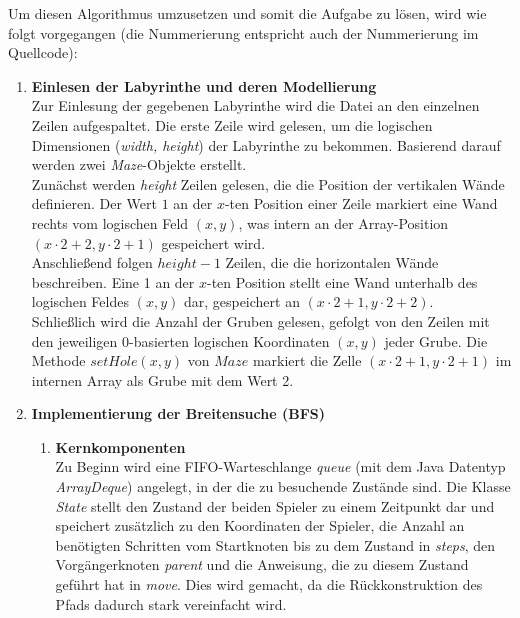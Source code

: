 \documentclass[a4paper,10pt,ngerman]{scrartcl}
\begin{document}
Um diesen Algorithmus umzusetzen und somit die Aufgabe zu lösen, wird wie folgt vorgegangen (die Nummerierung entspricht auch der Nummerierung im Quellcode): 
\begin{enumerate}
  \item \textbf{Einlesen der Labyrinthe und deren Modellierung}\\
  Zur Einlesung der gegebenen Labyrinthe wird die Datei an den einzelnen Zeilen aufgespaltet. Die erste Zeile wird gelesen, um die logischen Dimensionen (\textit{width, height}) der Labyrinthe zu bekommen. Basierend darauf werden zwei \textit{Maze}-Objekte erstellt. 
  \\
  Zunächst werden \textit{height} Zeilen gelesen, die die Position der vertikalen Wände definieren. Der Wert $1$ an der $x$-ten Position einer Zeile markiert eine Wand rechts vom logischen Feld $(x, y)$, was intern an der Array-Position $(x\cdot2+2, y\cdot2+1)$ gespeichert wird.
  \\
  Anschließend folgen $height - 1$ Zeilen, die die horizontalen Wände beschreiben. Eine 1 an der $x$-ten Position stellt eine Wand unterhalb des logischen Feldes $(x, y)$ dar, gespeichert an $(x\cdot2+1, y\cdot2+2)$. 
  \\
  Schließlich wird die Anzahl der Gruben gelesen, gefolgt von den Zeilen mit den jeweiligen 0-basierten logischen Koordinaten $(x, y)$ jeder Grube. Die Methode $setHole(x, y)$ von $Maze$ markiert die Zelle $(x\cdot2+1, y\cdot2+1)$ im internen Array als Grube mit dem Wert 2. 
  \item \textbf{Implementierung der Breitensuche (BFS)}
  \begin{enumerate}
    \item \textbf{Kernkomponenten}\\
    Zu Beginn wird eine FIFO-Warteschlange \textit{queue} (mit dem Java Datentyp \textit{ArrayDeque}) angelegt, in der die zu besuchende Zustände sind. Die Klasse \textit{State} stellt den Zustand der beiden Spieler zu einem Zeitpunkt dar und speichert zusätzlich zu den Koordinaten der Spieler, die Anzahl an benötigten Schritten vom Startknoten bis zu dem Zustand in \textit{steps}, den Vorgängerknoten \textit{parent} und die Anweisung, die zu diesem Zustand geführt hat in \textit{move}. Dies wird gemacht, da die Rückkonstruktion des Pfads dadurch stark vereinfacht wird. 
    \\\newline

\end{enumerate}
\end{enumerate}
\end{document}

